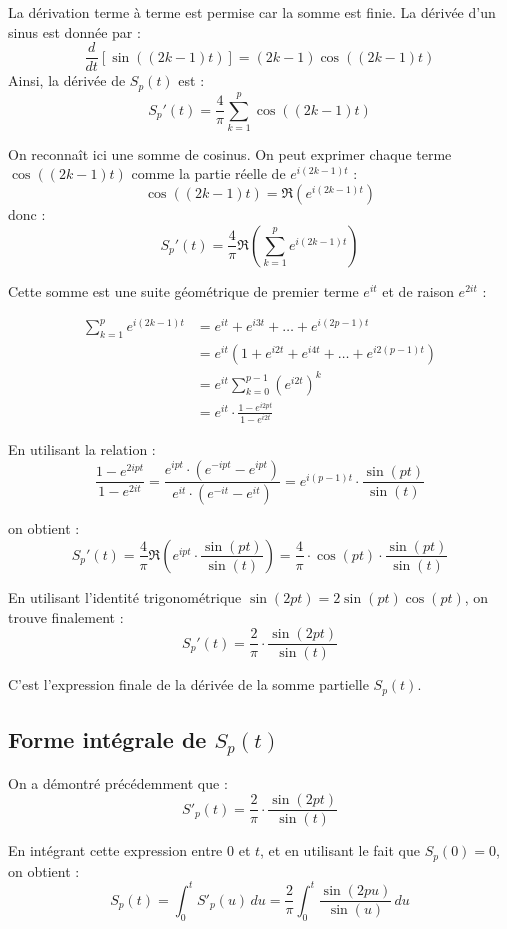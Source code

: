 \documentclass[11pt]{article} %
\begin{document}
\begin{large}
La dérivation terme à terme est permise car la somme est finie. La dérivée d'un sinus est donnée par :
\[
\frac{d}{dt}[\sin((2k - 1)t)] = (2k - 1)\cos((2k - 1)t)
\]
Ainsi, la dérivée de $S_p(t)$ est :
\[
S_p'(t) = \frac{4}{\pi} \sum_{k=1}^{p} \cos((2k - 1)t)
\]

On reconnaît ici une somme de cosinus. On peut exprimer chaque terme $\cos((2k - 1)t)$ comme la partie réelle de $e^{i(2k - 1)t}$ :
\[
\cos((2k - 1)t) = \Re\left(e^{i(2k - 1)t}\right)
\]
donc :
\[
S_p'(t) = \frac{4}{\pi} \Re\left( \sum_{k=1}^{p} e^{i(2k - 1)t} \right)
\]

Cette somme est une suite géométrique de premier terme $e^{it}$ et de raison $e^{2it}$ :

\begin{align*}
\sum_{k=1}^{p} e^{i(2k-1)t}
&= e^{it} + e^{i3t} + \dots + e^{i(2p - 1)t} \\
&= e^{it} \left(1 + e^{i2t} + e^{i4t} + \dots + e^{i2(p - 1)t} \right) \\
&= e^{it} \sum_{k=0}^{p - 1} (e^{i2t})^k \\
&= e^{it} \cdot \frac{1 - e^{i2pt}}{1 - e^{i2t}}
\end{align*}





En utilisant la relation :
\[
\frac{1 - e^{2ipt}}{1 - e^{2it}} = \frac{e^{ipt} \cdot (e^{-ipt} - e^{ipt})}{e^{it} \cdot (e^{-it} - e^{it})} = e^{i(p - 1)t} \cdot \frac{\sin(pt)}{\sin(t)}
\]

on obtient :
\[
S_p'(t) = \frac{4}{\pi} \Re\left( e^{ipt} \cdot \frac{\sin(pt)}{\sin(t)} \right)
= \frac{4}{\pi} \cdot \cos(pt) \cdot \frac{\sin(pt)}{\sin(t)}
\]

En utilisant l'identité trigonométrique $\sin(2pt) = 2\sin(pt)\cos(pt)$, on trouve finalement :
\[
S_p'(t) = \frac{2}{\pi} \cdot \frac{\sin(2pt)}{\sin(t)}
\]

C'est l'expression finale de la dérivée de la somme partielle \( S_p(t) \).


\subsection{Forme intégrale de $S_p(t)$}

On a démontré précédemment que :
\[
S'_p(t) = \frac{2}{\pi} \cdot \frac{\sin(2pt)}{\sin(t)}
\]

En intégrant cette expression entre 0 et \( t \), et en utilisant le fait que \( S_p(0) = 0 \), on obtient :
\[
S_p(t) = \int_0^t S'_p(u) \, du
= \frac{2}{\pi} \int_0^t \frac{\sin(2pu)}{\sin(u)} \, du
\]


\end{large}
\end{document}
